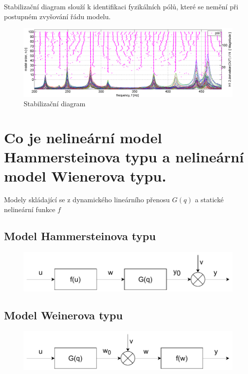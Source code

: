 \documentclass{article}
\begin{document}
	Stabilizační diagram slouží k identifikaci fyzikálních pólů, které se nemění při postupném zvyšování řádu modelu.
	\begin{figure}[h!]
		\centering
		\includegraphics[width=.6\linewidth]{figs/StabilizacniDiagram.png}
		\caption{Stabilizační diagram}
	\end{figure}
	
	\section{Co je nelineární model Hammersteinova typu a nelineární model Wienerova typu. }

	Modely skládající se z dynamického lineárního přenosu $G(q)$ a statické nelineární funkce $f$
	
	\subsection*{Model Hammersteinova typu}	
	\begin{figure}[h!]
		\centering
		\includegraphics[width=.6\linewidth]{figs/HammersteinuvModel.pdf}
	\end{figure}
	
	\subsection*{Model Weinerova typu}	
	\begin{figure}[h!]
		\centering
		\includegraphics[width=.6\linewidth]{figs/WeineruvModel.pdf}
	\end{figure}
\end{document}
